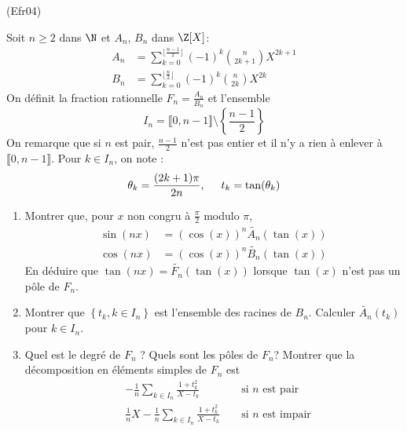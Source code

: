 \begin{tiny}(Efr04)\end{tiny} Soit $n\geq 2$ dans $\N$ et $A_n$, $B_n$ dans $\Z[X]$:
\begin{align*}
 A_n &= \sum_{k=0}^{\lfloor \frac{n-1}{2}\rfloor}(-1)^k\binom{n}{2k+1}X^{2k+1}\\
 B_n &= \sum_{k=0}^{\lfloor \frac{n}{2}\rfloor}(-1)^k\binom{n}{2k}X^{2k}
\end{align*}
 On définit la fraction rationnelle $F_n=\frac{A_n}{B_n}$ et l'ensemble 
\begin{displaymath}
 I_n = \llbracket 0, n-1 \rrbracket \setminus\left\lbrace \frac{n-1}{2} \right\rbrace 
\end{displaymath}
On remarque que si $n$ est pair, $\frac{n-1}{2}$ n'est pas entier et il n'y a rien à enlever à $\llbracket 0, n-1 \rrbracket$. Pour $k\in I_n$, on note :
\begin{displaymath}
 \theta_k = \frac{(2k+1)\pi}{2n},\hspace{0.5cm} t_k = \tan(\theta_k)
\end{displaymath}

\begin{enumerate}
 \item Montrer que, pour $x$ non congru à $\frac{\pi}{2}$ modulo $\pi$,
\begin{displaymath}
\begin{aligned}
  \sin(nx) &= (\cos(x))^n\widetilde{A_n}(\tan(x))\\
  \cos(nx) &= (\cos(x))^n\widetilde{B_n}(\tan(x))
 \end{aligned}
\end{displaymath}
En déduire que $\tan(nx)=\widetilde{F_n}(\tan(x))$ lorsque $\tan(x)$ n'est pas un pôle de $F_n$.
\item Montrer que $\left\lbrace t_k,k\in I_n\right\rbrace$ est l'ensemble des racines de $B_n$. Calculer $\widetilde{A_n}(t_k)$ pour $k\in I_n$.
\item Quel est le degré de $F_n$ ? Quels sont les pôles de $F_n$? Montrer que la décomposition en éléments simples de $F_n$ est
\begin{align*}
 &-\frac{1}{n}\sum_{k\in I_n}\frac{1+t_k^2}{X-t_k}& &\text{ si $n$ est pair}\\
&\frac{1}{n}X-\frac{1}{n}\sum_{k\in I_n}\frac{1+t_k^2}{X-t_k}& &\text{ si $n$ est impair}
\end{align*}

\end{enumerate}
